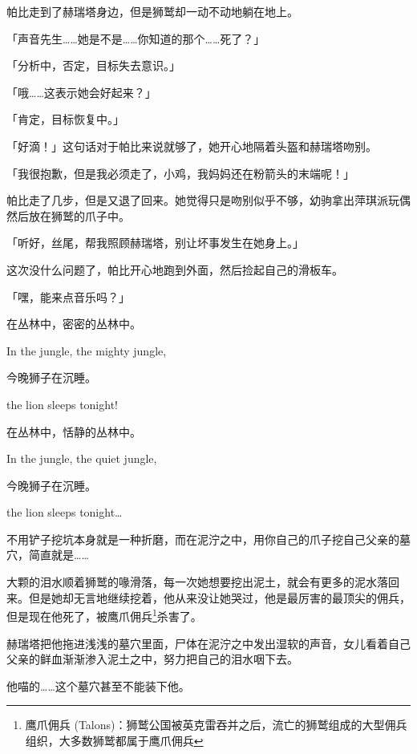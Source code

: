 帕比走到了赫瑞塔身边，但是狮鹫却一动不动地躺在地上。

「声音先生……她是不是……你知道的那个……死了？」

「{\mt 分析中，否定，目标失去意识。}」

「哦……这表示她会好起来？」

「{\mt 肯定，目标恢复中。}」

「好滴！」这句话对于帕比来说就够了，她开心地隔着头盔和赫瑞塔吻别。

「我很抱歉，但是我必须走了，小鸡，我妈妈还在粉箭头的末端呢！」

帕比走了几步，但是又退了回来。她觉得只是吻别似乎不够，幼驹拿出萍琪派玩偶然后放在狮鹫的爪子中。

「听好，丝尾，帮我照顾赫瑞塔，别让坏事发生在她身上。」

这次没什么问题了，帕比开心地跑到外面，然后捡起自己的滑板车。

「嘿，能来点音乐吗？」

\begin{song}
在丛林中，密密的丛林中。

In the jungle, the mighty jungle,

\medskip

今晚狮子在沉睡。

the lion sleeps tonight!

\medskip

在丛林中，恬静的丛林中。

In the jungle, the quiet jungle,

\medskip

今晚狮子在沉睡。

the lion sleeps tonight\dots
\end{song}

\horizonline


不用铲子挖坑本身就是一种折磨，而在泥泞之中，用你自己的爪子挖自己父亲的墓穴，简直就是……

大颗的泪水顺着狮鹫的喙滑落，每一次她想要挖出泥土，就会有更多的泥水落回来。但是她却无言地继续挖着，他从来没让她哭过，他是最厉害的最顶尖的佣兵，但是现在他死了，被鹰爪佣兵\footnote{鹰爪佣兵 (Talons)：狮鹫公国被英克雷吞并之后，流亡的狮鹫组成的大型佣兵组织，大多数狮鹫都属于鹰爪佣兵}杀害了。

赫瑞塔把他拖进浅浅的墓穴里面，尸体在泥泞之中发出湿软的声音，女儿看着自己父亲的鲜血渐渐渗入泥土之中，努力把自己的泪水咽下去。

他喵的……这个墓穴甚至不能装下他。

